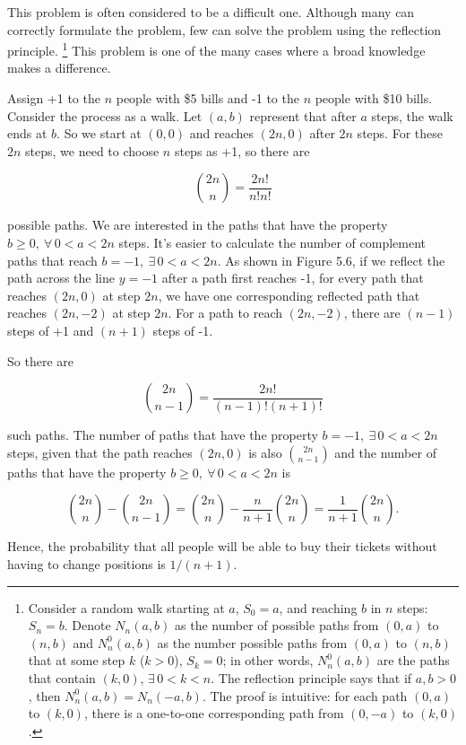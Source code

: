 \begin{solution}
This problem is often considered to be a difficult one. Although many can correctly
formulate the problem, few can solve the problem using the reflection principle.
\footnote[8]{Consider a random walk starting at $a$, $S_0=a$, and reaching $b$ in $n$ steps:
$S_n=b$. Denote $N_n(a,b)$ as the number of possible paths from $(0,a)$ to $(n,b)$ and
$N_n^0(a,b)$ as the number possible paths from $(0,a)$ to $(n,b)$ that at some step $k$
($k>0$), $S_k=0$; in other words, $N_n^0(a,b)$ are the paths that contain $(k,0)$,
$\exists\,0<k<n$. The reflection principle says that if $a,b>0$, then
$N_n^0(a,b)=N_n(-a,b)$. The proof is intuitive: for each path $(0,a)$ to $(k,0)$, there
is a one-to-one corresponding path from $(0,-a)$ to $(k,0)$.}
This problem is one of the many cases where a broad knowledge makes a difference.

Assign +1 to the $n$ people with \$5 bills and -1 to the $n$ people with \$10 bills.
Consider the process as a walk. Let $(a,b)$ represent that after $a$ steps, the walk ends at
$b$. So we start at $(0,0)$ and reaches $(2n,0)$ after $2n$ steps. For these $2n$ steps,
we need to choose $n$ steps as +1, so there are

\[
\binom{2n}{n}=\frac{2n!}{n!n!}
\]

possible paths. We are interested in the paths that have the property
$b\geq0,\ \forall\,0<a<2n$ steps. It's easier to calculate the number of complement
paths that reach $b=-1,\ \exists\,0<a<2n$. As shown in Figure 5.6, if we reflect the
path across the line $y=-1$ after a path first reaches -1, for every path that reaches
$(2n,0)$ at step $2n$, we have one corresponding reflected path that reaches $(2n,-2)$
at step $2n$. For a path to reach $(2n,-2)$, there are $(n-1)$ steps of +1 and $(n+1)$
steps of -1.

So there are

\[
\binom{2n}{n-1}=\frac{2n!}{(n-1)!(n+1)!}
\]

such paths. The number of paths that have the property $b=-1,\ \exists\,0<a<2n$ steps,
given that the path reaches $(2n,0)$ is also $\binom{2n}{n-1}$ and the number of paths
that have the property $b\geq0,\ \forall\,0<a<2n$ is

\[
\binom{2n}{n}-\binom{2n}{n-1}
=\binom{2n}{n}-\frac{n}{n+1}\binom{2n}{n}
=\frac{1}{n+1}\binom{2n}{n}.
\]

Hence, the probability that all people will be able to buy their tickets without having to
change positions is $1/(n+1)$.


\end{solution}
